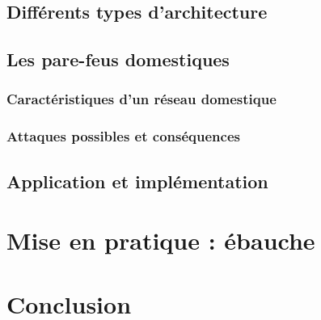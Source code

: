 \documentclass[]{article}
\begin{document}
\subsection{Différents types d'architecture}

\subsection{Les pare-feus domestiques}

\subsubsection{Caractéristiques d'un réseau domestique}

\subsubsection{Attaques possibles et conséquences}

\subsection{Application et implémentation}

\newpage

\section{Mise en pratique : ébauche}
\newpage
\section*{Conclusion}




\end{document}
